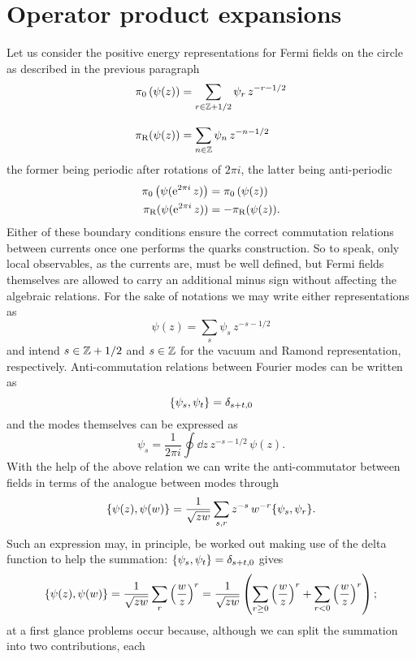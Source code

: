 \section{Operator product expansions}
 \label{OPE}
 Let us consider the positive energy representations
 for Fermi fields on the circle as described in the 
 previous paragraph
 \begin{align*}
 \pi_0\left(\psi(z)\right)&=\sum_{r\in\mathbb{Z}+1/2}\psi_r\,
 z^{-r-1/2}\\[2ex]
 \pi_{\textrm{R}}(\psi(z))&=\sum_{n\in\mathbb{Z}}\psi_n \,z^{-n-1/2}
 \end{align*}
 the former being periodic after rotations of $2\pi i$,
 the latter being anti-periodic
 \begin{align*}
 \pi_0\left(\psi(\operatorname{e}^{2\pi i} z)\right)&=\pi_0\left(\psi(z)\right)\\
 \pi_{\textrm{R}}(\psi(\operatorname{e}^{2\pi i}z))&=-\pi_{\textrm{R}}(\psi(z)).
 \end{align*}
 Either of these boundary conditions ensure the correct
 commutation relations between currents once one
 performs the quarks construction. So to speak, only
 local observables, as the currents are, must be well
 defined, but Fermi fields themselves are allowed to carry
 an additional minus sign without affecting the
 algebraic relations. For the sake of notations we may
 write either representations as \cite{Fuchs:1992}
 \[
 \psi(z)=\sum_{s}\psi_s\,z^{-s-1/2}
 \]
 and intend $s\in\mathbb{Z}+1/2$ and $s\in\mathbb{Z}$ for the vacuum
 and Ramond representation, respectively. Anti-commutation 
 relations between Fourier modes can be written as
 \[
 \{\psi_s,\psi_t\}=\delta_{s+t,0}
 \]
 and the modes themselves can be expressed as
 \[
 \psi_s =\frac{1}{2\pi i}\oint\dd z\,z^{-s-1/2}
 \,\psi(z).
 \]
 With the help of the above relation we can write the 
 anti-commutator between fields in terms of the 
 analogue between modes through
 \[
 \{\psi(z),\psi(w)\}=\frac{1}{\sqrt{zw}}\sum_{s,r}
 z^{-s}\,w^{-r}\{\psi_s,\psi_r\}.
 \]
 Such an expression may, in principle, be worked out
 making use of the delta function to help the summation:
 $\{\psi_s,\psi_t\}=\delta_{s+t,0}$ gives
 \begin{equation*}
 \{\psi(z),\psi(w)\}=\frac{1}{\sqrt{zw}}
 \sum_{r}{\left(\frac{w}{z}\right)}^r=
 \frac{1}{\sqrt{zw}}\left(
 \sum_{r\geq 0}{\left(\frac{w}{z}\right)}^r+
 \sum_{r<0}{\left(\frac{w}{z}\right)}^r
 \right);
 \end{equation*}
 at a first glance problems occur because, although we
 can split the summation into two contributions, each
